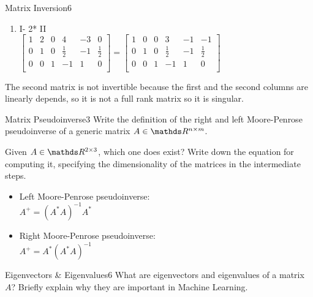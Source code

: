 \begin{questions}
\begin{question}{Matrix Inversion}{6}
\begin{answer}
\begin{enumerate}
		\item I- 2* II \\
		\bigskip
		$	
		\left[\begin{array}{ccc|ccc}
		1 & 2 & 0 & 4&-3&0    \\       
		0& 1 & 0 & \frac{1}{2}&-1&\frac{1}{2}    \\       
		0& 0 & 1 & -1&1&0     \\      
		\end{array} \right]=
		\left[\begin{array}{ccc|ccc}
		1 & 0 & 0 & 3&-1&-1    \\       
		0& 1 & 0 & \frac{1}{2}&-1&\frac{1}{2}    \\       
		0& 0 & 1 & -1&1&0     \\      
		\end{array} \right]
		$
	\end{enumerate}
 
 The second matrix is not invertible because the first and the second columns are linearly depends, so it is not a full rank matrix  so it is singular.
\end{answer}

\end{question}
	

\begin{question}{Matrix Pseudoinverse}{3}
	Write the definition of the right and left Moore-Penrose pseudoinverse of a generic matrix $A \in \R^{n\times m}$.
	
	Given $A \in \R^{2 \times 3}$, which one does exist? Write down the equation for computing it, specifying the dimensionality of the matrices in the intermediate steps.
	
\begin{answer}
\begin{itemize}
	\item Left Moore-Penrose pseudoinverse: \\
		$A^+ = (A^*A)^{-1}A^*$
	\item Right Moore-Penrose pseudoinverse: \\
		$A^+ = A^*(A^*A)^{-1}$
\end{itemize}
\end{answer}
\end{question}


\begin{question}{Eigenvectors \& Eigenvalues}{6}
What are eigenvectors and eigenvalues of a matrix $A$? Briefly explain why they are important in Machine Learning.

\begin{answer}\end{answer}

\end{question}


\end{questions}
